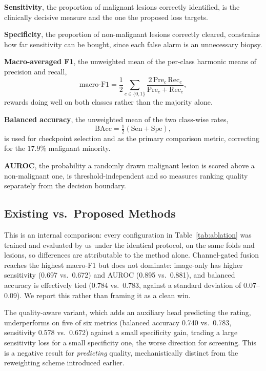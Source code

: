 \documentclass[conference]{IEEEtran}
\begin{document}
\textbf{Sensitivity}, the proportion of malignant lesions correctly identified, is the clinically decisive measure and the one the proposed loss targets.

\textbf{Specificity}, the proportion of non-malignant lesions correctly cleared, constrains how far sensitivity can be bought, since each false alarm is an unnecessary biopsy.

\textbf{Macro-averaged F1}, the unweighted mean of the per-class harmonic means of precision and recall,
\begin{equation}
\text{macro-F1}=\frac{1}{2}\sum_{c\in\{0,1\}}\frac{2\,\mathrm{Pre}_c\,\mathrm{Rec}_c}{\mathrm{Pre}_c+\mathrm{Rec}_c},
\end{equation}
rewards doing well on both classes rather than the majority alone.

\textbf{Balanced accuracy}, the unweighted mean of the two class-wise rates,
\begin{equation}
\mathrm{BAcc}=\tfrac{1}{2}\left(\mathrm{Sen}+\mathrm{Spe}\right),
\end{equation}
is used for checkpoint selection and as the primary comparison metric, correcting for the $17.9\%$ malignant minority.

\textbf{AUROC}, the probability a randomly drawn malignant lesion is scored above a non-malignant one, is threshold-independent and so measures ranking quality separately from the decision boundary.

\subsection{Existing vs.\ Proposed Methods}
\label{sec:main}
This is an internal comparison: every configuration in Table~\ref{tab:ablation} was trained and evaluated by us under the identical protocol, on the same folds and lesions, so differences are attributable to the method alone. Channel-gated fusion reaches the highest macro-F1 but does not dominate: image-only has higher sensitivity (0.697 vs.\ 0.672) and AUROC (0.895 vs.\ 0.881), and balanced accuracy is effectively tied (0.784 vs.\ 0.783, against a standard deviation of 0.07--0.09). We report this rather than framing it as a clean win.

The quality-aware variant, which adds an auxiliary head predicting the rating, underperforms on five of six metrics (balanced accuracy 0.740 vs.\ 0.783, sensitivity 0.578 vs.\ 0.672) against a small specificity gain, trading a large sensitivity loss for a small specificity one, the worse direction for screening. This is a negative result for \emph{predicting} quality, mechanistically distinct from the reweighting scheme introduced earlier.
\end{document}
